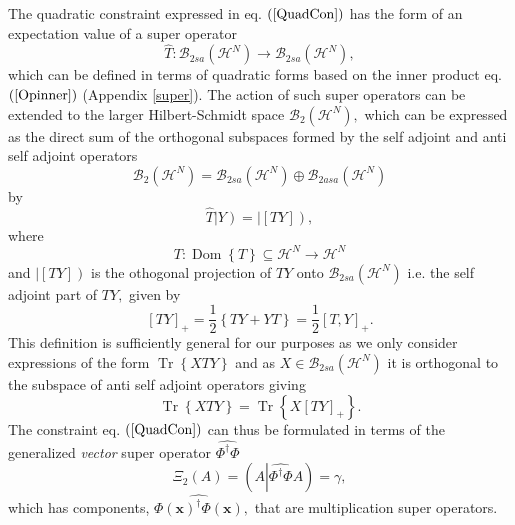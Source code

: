 \documentclass[aps,preprint]{revtex4}%
\begin{document}
The quadratic constraint expressed in eq. $\left(  \ref{QuadCon}\right)  $ has
the form of an expectation value of a super operator
\begin{equation}
\widehat{T}:\mathcal{B}_{2sa}\left(  \mathcal{H}^{N}\right)  \rightarrow
\mathcal{B}_{2sa}\left(  \mathcal{H}^{N}\right)  ,
\end{equation}
which can be defined in terms of quadratic forms based on the inner product
eq. $\left(  \ref{Opinner}\right)  $ (Appendix \ref{super}). The action of
such super operators can be extended to the larger Hilbert-Schmidt space
$\mathcal{B}_{2}\left(  \mathcal{H}^{N}\right)  ,$ which can be expressed as
the direct sum of the orthogonal subspaces formed by the self adjoint and anti
self adjoint operators
\begin{equation}
\mathcal{B}_{2}\left(  \mathcal{H}^{N}\right)  =\mathcal{B}_{2sa}\left(
\mathcal{H}^{N}\right)  \oplus\mathcal{B}_{2asa}\left(  \mathcal{H}%
^{N}\right)
\end{equation}
by
\begin{equation}
\widehat{T}\left\vert Y\right)  =\left\vert \left[  TY\right]  \right)  ,
\end{equation}
where
\begin{equation}
T:\operatorname{Dom}\left\{  T\right\}  \subseteq\mathcal{H}^{N}%
\rightarrow\mathcal{H}^{N}%
\end{equation}
and $\left\vert \left[  TY\right]  \right)  $ is the othogonal projection of
$TY$ onto $\mathcal{B}_{2sa}\left(  \mathcal{H}^{N}\right)  $ i.e. the self
adjoint part of $TY,$ given by
\[
\left[  TY\right]  _{+}=\frac{1}{2}\left\{  TY+YT\right\}  =\frac{1}{2}\left[
T,Y\right]  _{+}.
\]
This definition is sufficiently general for our purposes as we only consider
expressions of the form $\operatorname{Tr}\left\{  XTY\right\}  $ and as
$X\in\mathcal{B}_{2sa}\left(  \mathcal{H}^{N}\right)  $ it is orthogonal to
the subspace of anti self adjoint operators giving
\begin{equation}
\operatorname{Tr}\left\{  XTY\right\}  =\operatorname{Tr}\left\{  X\left[
TY\right]  _{+}\right\}  .
\end{equation}
The constraint eq. $\left(  \ref{QuadCon}\right)  $ can thus be formulated in
terms of the generalized \emph{vector} super operator $\widehat{\Phi^{\dagger
}\Phi}$%
\begin{equation}
\Xi_{2}\left(  A\right)  =\left(  A\left\vert \widehat{\Phi^{\dagger}\Phi
}A\right.  \right)  =\gamma,
\end{equation}
which has components, $\widehat{\Phi\left(  \boldsymbol{x}\right)  ^{\dagger
}\Phi\left(  \boldsymbol{x}\right)  },$ that are multiplication super operators.
\end{document}
